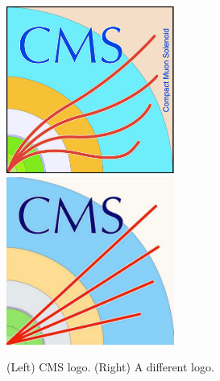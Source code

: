 \clearpage
\begin{figure}[t]
  \begin{center}
    \includegraphics[width=0.49\textwidth]{supplementary/figures/CMS_logo} \,
    \includegraphics[width=0.49\textwidth]{supplementary/figures/CMS_logo_no_magnet} \\
  \end{center}
  \caption{
    (Left) CMS logo. 
    (Right) A different logo. 
    \label{fig:cms_logo_2} 
  }
\end{figure}

\clearpage

